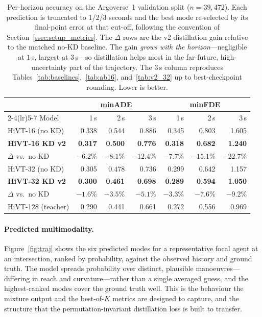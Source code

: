 \begin{table}[htbp]
  \centering
  \caption{Per-horizon accuracy on the Argoverse~1 validation split
    ($n{=}39{,}472$). Each prediction is truncated to $1$/$2$/$3$ seconds and the
    best mode re-selected by its final-point error at that cut-off, following the
    convention of Section~\ref{ssec:setup_metrics}. The $\Delta$ rows are the v2
    distillation gain relative to the matched no-KD baseline. The gain
    \emph{grows with the horizon}---negligible at $1$\,s, largest at $3$\,s---so
    distillation helps most in the far-future, high-uncertainty part of the
    trajectory. The $3$\,s column reproduces
    Tables~\ref{tab:baselines},~\ref{tab:ab16}, and~\ref{tab:v2_32} up to
    best-checkpoint rounding. Lower is better.}
  \label{tab:perhorizon}
  \begin{tabular}{lrrrrrr}
    \toprule
    & \multicolumn{3}{c}{minADE} & \multicolumn{3}{c}{minFDE} \\
    \cmidrule(lr){2-4}\cmidrule(lr){5-7}
    Model & 1\,s & 2\,s & 3\,s & 1\,s & 2\,s & 3\,s \\
    \midrule
    HiVT-16 (no KD)        & 0.338 & 0.544 & 0.886 & 0.345 & 0.803 & 1.605 \\
    \textbf{HiVT-16 KD v2} & \textbf{0.317} & \textbf{0.500} & \textbf{0.776}
                           & \textbf{0.318} & \textbf{0.682} & \textbf{1.240} \\
    \quad$\Delta$ vs.\ no KD & $-6.2\%$ & $-8.1\%$ & $-12.4\%$
                             & $-7.7\%$ & $-15.1\%$ & $-22.7\%$ \\
    \midrule
    HiVT-32 (no KD)        & 0.305 & 0.478 & 0.736 & 0.299 & 0.642 & 1.157 \\
    \textbf{HiVT-32 KD v2} & \textbf{0.300} & \textbf{0.461} & \textbf{0.698}
                           & \textbf{0.289} & \textbf{0.594} & \textbf{1.050} \\
    \quad$\Delta$ vs.\ no KD & $-1.6\%$ & $-3.5\%$ & $-5.1\%$
                             & $-3.3\%$ & $-7.6\%$ & $-9.2\%$ \\
    \midrule
    HiVT-128 (teacher)     & 0.290 & 0.441 & 0.661 & 0.272 & 0.556 & 0.969 \\
    \bottomrule
  \end{tabular}
\end{table}

\paragraph{Predicted multimodality.}
Figure~\ref{fig:traj} shows the six predicted modes for a representative focal
agent at an intersection, ranked by probability, against the observed history and
ground truth. The model spreads probability over distinct, plausible
manoeuvres---differing in reach and curvature---rather than a single averaged
guess, and the highest-ranked modes cover the ground truth well. This is the
behaviour the mixture output and the best-of-$K$ metrics are designed to capture,
and the structure that the permutation-invariant distillation loss is built to
transfer.

